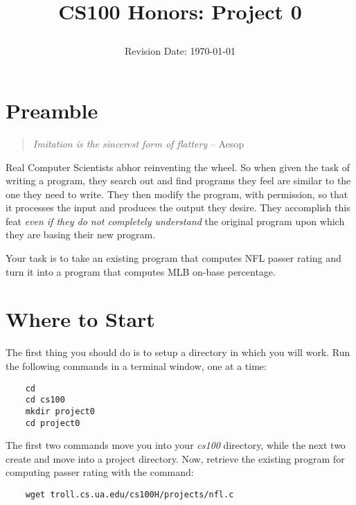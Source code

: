 \documentclass[12pt]{article}
\title{CS100 Honors: Project 0\\
\date{Revision Date: \today}}
\begin{document}
\maketitle

\thispagestyle{empty}

\W\subsubsection*{}
\W\htmlrule


\section*{Preamble}

\begin{quote}
{\it Imitation is the sincerest form of flattery}
-- Aesop
\end{quote}

Real Computer Scientists abhor reinventing the wheel. 
So when given the task of writing a program, they search out and find programs
they feel are similar to the one they need to write.
They then modify the program, with permission,
so that it processes the input and
produces the output
they desire.
They accomplish this feat {\it even if they do not completely understand}
the original program upon which they are basing their new program.

Your task is to take an existing program that computes
NFL passer rating
and turn it into a program that computes
MLB on-base percentage.

\section*{Where to Start}

The first thing you should do is to setup a directory in which you will work.
Run the following commands in a terminal window, one at a time:

\begin{verbatim}
    cd
    cd cs100
    mkdir project0
    cd project0
\end{verbatim}

The first two commands move you into your {\it cs100} directory, while the next
two create and move into a project directory.
Now, 
retrieve the existing program for computing passer rating
with the command:

\begin{verbatim}
    wget troll.cs.ua.edu/cs100H/projects/nfl.c
\end{verbatim}
\end{document}

